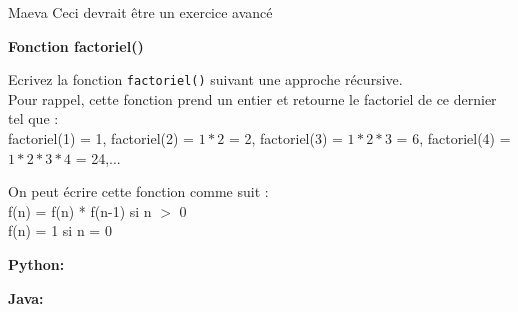 	\begin{note}{Maeva}
    Ceci devrait être un exercice avancé
\end{note} 
	\begin{Exercice}[10 minutes] \textbf{Fonction factoriel()} 
	
	Ecrivez la fonction \lstinline{factoriel()} suivant une approche récursive. \\ 
	
	Pour rappel, cette fonction prend un entier et retourne le factoriel de ce dernier tel que : \\
	
	factoriel(1) = 1, factoriel(2) = $1*2$ = 2, factoriel(3) = $1*2*3$ = 6, factoriel(4) = $1*2*3*4$ = 24,...
	  
	
		\begin{conseil} 
		On peut écrire cette fonction comme suit : \\
		
		f(n) = f(n) * f(n-1) si n $>$ 0 \\
		
		f(n) = 1 si n = 0
		
		\end{conseil} 
	
        \begin{solution} 
            \textbf{Python:}
            
            \textbf{Java:}
            
		\end{solution} 
	
	\end{Exercice}
	
